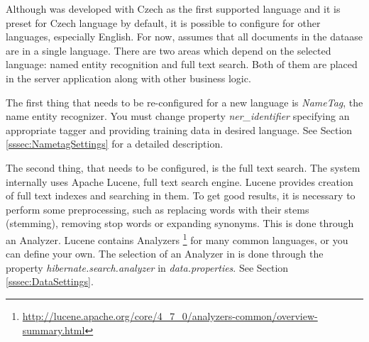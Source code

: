 
Although \textan{} was developed with Czech  as the first supported language
and it is preset for
Czech language by default, it is possible to configure \textan{} for other languages,
especially English. For now, \textan{} assumes that all documents in the dataase
are in a single language. There are
two areas which depend on the selected language: named entity recognition and full
text search. Both of them are placed in the server application along with other
business logic.

The first thing that needs to be re-configured for a new language is {\it
NameTag}, the name entity recognizer. 
You must change property {\it ner\_identifier}
specifying an appropriate tagger and providing
training data in desired language. See Section \ref{sssec:NametagSettings} for
a detailed description.

The second thing, that needs to be configured, is the full text search. The system
internally uses Apache Lucene, full text search engine. Lucene provides creation
of full text indexes and searching in them. To get good results, it is necessary
to perform some preprocessing, such as replacing words with their stems
(stemming), removing stop words or expanding synonyms. This is done through an
Analyzer. Lucene contains Analyzers%
\footnote{\url{http://lucene.apache.org/core/4_7_0/analyzers-common/overview-summary.html}}
for many common languages, or you can define your own. The selection of an Analyzer in 
\textan{} is done through the property \emph{hibernate.search.analyzer} in
\emph{data.properties}. See Section \ref{sssec:DataSettings}.
